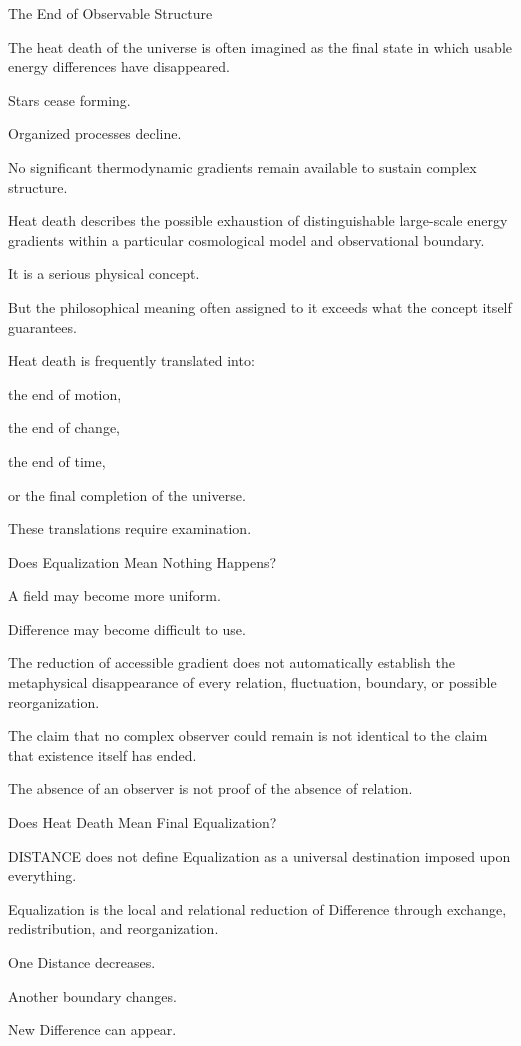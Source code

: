 The End of Observable Structure

The heat death of the universe is often imagined as the final state in which usable energy differences have disappeared.

Stars cease forming.

Organized processes decline.

No significant thermodynamic gradients remain available to sustain complex structure.

Heat death describes the possible exhaustion of distinguishable large-scale energy gradients within a particular cosmological model and observational boundary.

It is a serious physical concept.

But the philosophical meaning often assigned to it exceeds what the concept itself guarantees.

Heat death is frequently translated into:

the end of motion,

the end of change,

the end of time,

or the final completion of the universe.

These translations require examination.

Does Equalization Mean Nothing Happens?

A field may become more uniform.

Difference may become difficult to use.

The reduction of accessible gradient does not automatically establish the metaphysical disappearance of every relation, fluctuation, boundary, or possible reorganization.

The claim that no complex observer could remain is not identical to the claim that existence itself has ended.

The absence of an observer is not proof of the absence of relation.

Does Heat Death Mean Final Equalization?

DISTANCE does not define Equalization as a universal destination imposed upon everything.

Equalization is the local and relational reduction of Difference through exchange, redistribution, and reorganization.

One Distance decreases.

Another boundary changes.

New Difference can appear.

